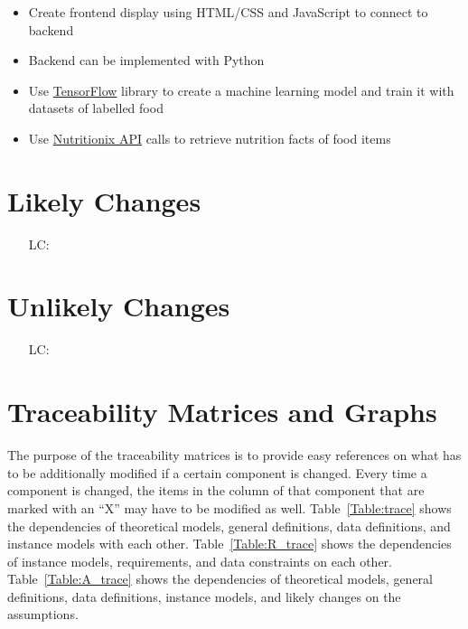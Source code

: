 \documentclass[12pt]{article}
\newcounter{lcnum} %
\begin{document}
\begin{itemize}
	\item Create frontend display using HTML/CSS and JavaScript to connect to backend
	\item Backend can be implemented with Python
	\item Use \href{https://www.tensorflow.org/}{TensorFlow} library to create a machine learning model and train it with datasets of labelled food
	\item Use \href{https://www.nutritionix.com/business/api}{Nutritionix API} calls to retrieve nutrition facts of food items
\end{itemize}

\section{Likely Changes}    

\noindent \begin{itemize}

\item[LC\refstepcounter{lcnum}\thelcnum\label{LC_meaningfulLabel}:] 

\end{itemize}

\section{Unlikely Changes}    

\noindent \begin{itemize}

\item[LC\refstepcounter{lcnum}\thelcnum\label{LC_meaningfulLabel}:] 

\end{itemize}

\section{Traceability Matrices and Graphs}

The purpose of the traceability matrices is to provide easy references on what
has to be additionally modified if a certain component is changed.  Every time a
component is changed, the items in the column of that component that are marked
with an ``X'' may have to be modified as well.  Table~\ref{Table:trace} shows the
dependencies of theoretical models, general definitions, data definitions, and
instance models with each other. Table~\ref{Table:R_trace} shows the
dependencies of instance models, requirements, and data constraints on each
other. Table~\ref{Table:A_trace} shows the dependencies of theoretical models,
general definitions, data definitions, instance models, and likely changes on
the assumptions.
\end{document}
